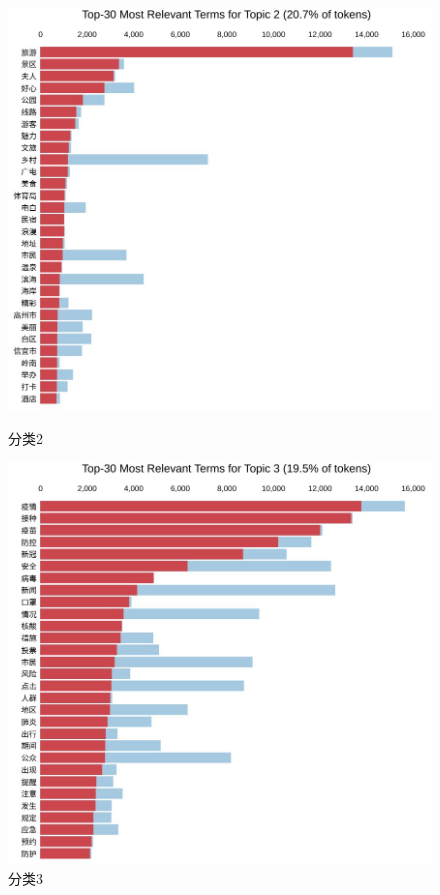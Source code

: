 \documentclass[bwprint]{gmcmthesis}
\begin{document}
\begin{figure}[H]
	\centering
	\begin{minipage}{0.49\linewidth}
		\centering
		\includegraphics[width=0.9\linewidth]{figures/news1.png}
		\caption{分类2}
		\label{news1}%
	\end{minipage}
	\begin{minipage}{0.49\linewidth}
		\centering
		\includegraphics[width=0.9\linewidth]{figures/news2.png}
		\caption{分类3}
		\label{news2}%
	\end{minipage}
	

\end{figure}
\end{document}
